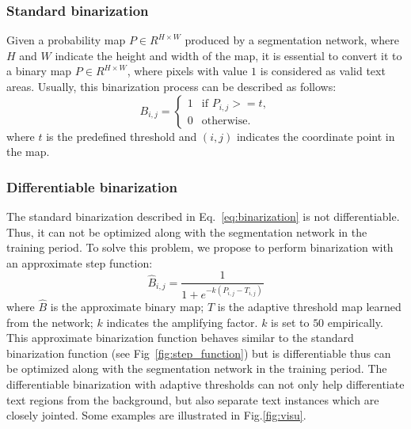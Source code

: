 \documentclass[letterpaper]{article} %
\begin{document}
\subsubsection{Standard binarization}
Given a probability map $P \in R^{H \times W}$ produced by a segmentation network, where $H$ and $W$ indicate the height and width of the map, it is essential to convert it to a binary map $P \in R^{H \times W}$, where pixels with value $1$ is considered as valid text areas. Usually, this binarization process can be described as follows:
\begin{equation}
    B_{i, j}=
    \begin{cases}
        1& \text{if } P_{i, j} >= t, \\
        0&  \text{otherwise.}
    \end{cases}
    \label{eq:binarization}
\end{equation}
where $t$ is the predefined threshold and $(i, j)$ indicates the coordinate point in the map.

\subsubsection{Differentiable binarization}
The standard binarization described in Eq.~\ref{eq:binarization} is not differentiable. Thus, it can not be optimized along with the segmentation network in the training period. To solve this problem, we propose to perform binarization with an approximate step function:
\begin{equation}
    \hat{B}_{i, j}=\frac{1}{1+e^{-k (P_{i, j} - T_{i, j})}}
    \label{eq:db}
\end{equation}
where $\hat{B}$ is the approximate binary map; $T$ is the adaptive threshold map learned from the network; $k$ indicates the amplifying factor. $k$ is set to $50$ empirically.
This approximate binarization function behaves similar to the standard binarization function (see Fig~\ref{fig:step_function}) but is differentiable thus can be optimized along with the segmentation network in the training period.
The differentiable binarization with adaptive thresholds can not only help differentiate text regions from the background, but also separate text instances which are closely jointed. Some examples are illustrated in Fig.\ref{fig:visu}.
\end{document}
